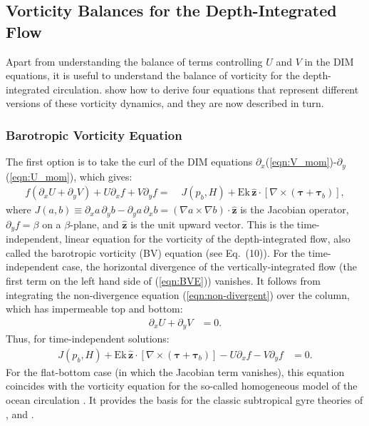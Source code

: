 \documentclass{ametsocV6.2}
\begin{document}
\subsection{Vorticity Balances for the Depth-Integrated Flow}

Apart from understanding the balance of terms controlling $U$ and $V$ in the DIM equations, it is useful to understand the balance of vorticity for the depth-integrated circulation.
\citet{waldman&giordani23} show how to derive four equations that represent different versions of these vorticity dynamics, and they are now described in turn.

\subsubsection{Barotropic Vorticity Equation}
\label{sect:BVE}
The first option is to take the curl of the DIM equations $\partial_x$(\ref{eqn:V_mom})-$\partial_y$(\ref{eqn:U_mom}), which gives:
\begin{align}
f \left( \partial_x   U + \partial_y V \right) + U \partial_x f + V \partial_y f = & \; J(p_b, H) + \mathrm{Ek} \, \hat{\mathbf{z}} \cdot \left[ \nabla \times \left( \boldsymbol{\tau} + \boldsymbol{\tau}_b \right) \right] ,
\label{eqn:BVE}
\end{align}
where $J(a,b) \equiv \partial_x a \, \partial_y b - \partial_y a \, \partial_x b = \left( \nabla a \times \nabla b \right) \cdot \hat{\mathbf{z}}$ is the Jacobian operator, $\partial_y f = \beta$ on a $\beta$-plane, and $\hat{\mathbf{z}}$ is the unit upward vector.
This is the time-independent, linear equation for the vorticity of the depth-integrated flow, also called the barotropic vorticity (BV) equation (see \citealt{waldman&giordani23} Eq.~(10)).
For the time-independent case, the horizontal divergence of the vertically-integrated flow (the first term on the left hand side of (\ref{eqn:BVE})) vanishes.
It follows from integrating the non-divergence equation (\ref{eqn:non-divergent}) over the column, which has impermeable top and bottom:
\begin{align}
 \partial_x U + \partial_y V & = 0 .
\label{eqn:divUiszero}
\end{align}
Thus, for time-independent solutions:
 \begin{align}
 J(p_b, H) + \mathrm{Ek} \, \hat{\mathbf{z}} \cdot \left[ \nabla \times \left( \boldsymbol{\tau} + \boldsymbol{\tau}_b \right) \right] -  U \partial_x f - V \partial_y f & = 0 .
 \label{eqn:BVE_constraint}
\end{align}
For the flat-bottom case (in which the Jacobian term vanishes), this equation coincides with the vorticity equation for the so-called homogeneous model of the ocean circulation \citep{pedlosky96,vallis06,klinger&haine19}.
It provides the basis for the classic subtropical gyre theories of \citet{sverdrup47, stommel48}, and \citet{munk50}.
\end{document}
